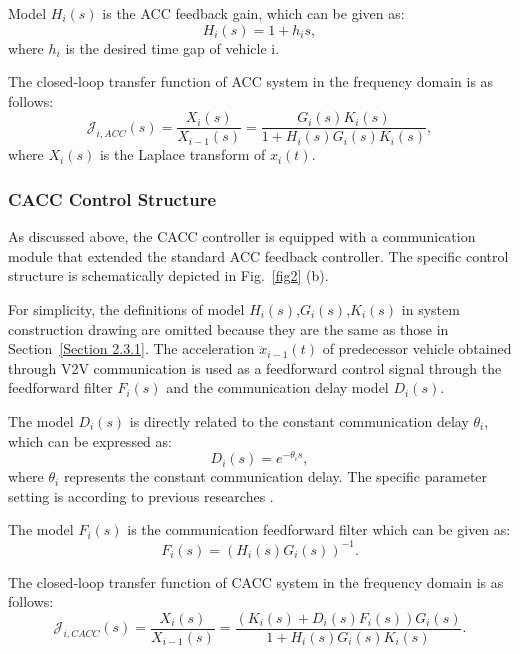 \documentclass[journal]{IEEEtran}
\begin{document}
Model $H_i (s)$ is the ACC feedback gain, which can be given as:
\begin{equation}
  H_{i}(s)=1+h_{i} s,
\end{equation}
where $h_i$ is the desired time gap of vehicle i.

The closed-loop transfer function of ACC system in the frequency domain is as follows:
\begin{equation}
  \mathcal{J}_{i, A C C}(s)=\frac{X_{i}(s)}{X_{i-1}(s)}=\frac{G_{i}(s) K_{i}(s)}{1+H_{i}(s) G_{i}(s) K_{i}(s)},
\end{equation}
where $X_i (s)$ is the Laplace transform of $x_i (t)$.

\subsubsection{CACC Control Structure}
\label{Section 2.3.2}

As discussed above, the CACC controller is equipped with a communication module that extended the standard ACC feedback controller. The specific control structure is schematically depicted in Fig.~\ref{fig2} (b).

For simplicity, the definitions of model $H_i(s)$,$G_i(s)$,$K_i(s)$ in system construction drawing are omitted because they are the same as those in Section~\ref{Section 2.3.1}. The acceleration $\ddot{x}_{i-1}(t)$ of predecessor vehicle obtained through V2V communication is used as a feedforward control signal through the feedforward filter $F_i(s)$ and the communication delay model $D_i(s)$.

The model $D_i(s)$ is directly related to the constant communication delay $\theta_i$, which can be expressed as:
\begin{equation}
  D_{i}(s)=e^{-\theta_{i} s},
\end{equation}
where $\theta_i$ represents the constant communication delay. The specific parameter setting is according to previous researches \citep{navas2016using,zhang2020control}.

The model $F_i(s)$ is the communication feedforward filter which can be given as:
\begin{equation}
  F_{i}(s)=\left(H_{i}(s) G_{i}(s)\right)^{-1}.
\end{equation}

The closed-loop transfer function of CACC system in the frequency domain is as follows:
\begin{equation}
  \mathcal{J}_{i, C A C C}(s)=\frac{X_{i}(s)}{X_{i-1}(s)}=\frac{\left(K_{i}(s)+D_{i}(s) F_{i}(s)\right) G_{i}(s)}{1+H_{i}(s) G_{i}(s) K_{i}(s)}.
\end{equation}
\end{document}
